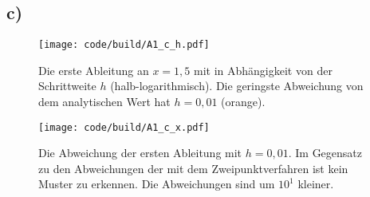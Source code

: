 \subsection{c)}
\begin{figure}
    \centering
    \texttt{[image: code/build/A1\_c\_h.pdf]}
    \caption{Die erste Ableitung an $x=1,5$ mit in Abhängigkeit von der Schrittweite $h$ (halb-logarithmisch).
    Die geringste Abweichung von dem analytischen Wert hat $h=0,01$ (orange).}
\end{figure}

\begin{figure}
    \centering
    \texttt{[image: code/build/A1\_c\_x.pdf]}
    \caption{Die Abweichung der ersten Ableitung mit $h=0,01$. 
    Im Gegensatz zu den Abweichungen der mit dem Zweipunktverfahren ist kein Muster zu erkennen.
    Die Abweichungen sind um $10^1$ kleiner.}
\end{figure}
\FloatBarrier